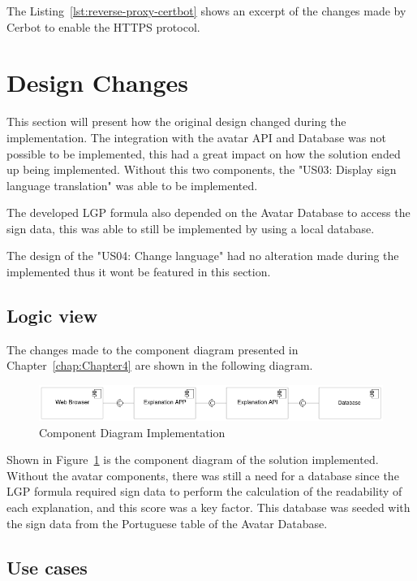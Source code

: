 The Listing~\ref{lst:reverse-proxy-certbot} shows an excerpt of the changes made by Cerbot to enable the HTTPS protocol.

\section{Design Changes}

This section will present how the original design changed during the implementation.
The integration with the avatar API and Database was not possible to be implemented, this had a great impact on how the solution ended up being implemented.
Without this two components, the "US03: Display sign language translation" was able to be implemented.

The developed \gls{LGP} formula also depended on the Avatar Database to access the sign data, this was able to still be implemented by using a local database.

The design of the "US04: Change language" had no alteration made during the implemented thus it wont be featured in this section.

\subsection{Logic view}

The changes made to the component diagram presented in Chapter~\ref{chap:Chapter4} are shown in the following diagram.

\begin{figure}[H]
\centering
\includegraphics[width=\textwidth,keepaspectratio]{ch5/assets/component_diagram_Implement.png}
\caption[Component Diagram Implementation]{Component Diagram Implementation}
\label{fig:componentImp}
\end{figure}

Shown in Figure~\ref{fig:componentImp} is the component diagram of the solution implemented.
Without the avatar components, there was still a need for a database since the \gls{LGP} formula required sign data to perform the calculation of the readability of each explanation, and this score was a key factor.
This database was seeded with the sign data from the Portuguese table of the Avatar Database.

\subsection{Use cases}

